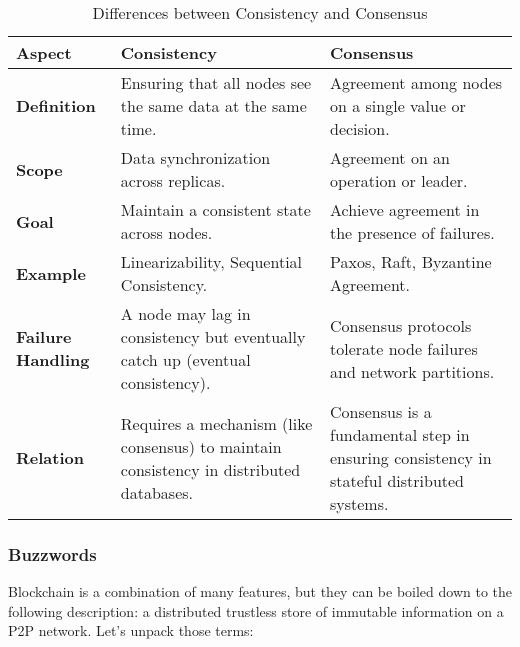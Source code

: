 \begin{table}[h]
    \centering
    \renewcommand{\arraystretch}{1.3}
    \begin{tabular}{|l|p{6cm}|p{6cm}|}
        \hline
        \textbf{Aspect} & \textbf{Consistency} & \textbf{Consensus} \\
        \hline
        \textbf{Definition} & Ensuring that all nodes see the same data at the same time. & Agreement among nodes on a single value or decision. \\
        \hline
        \textbf{Scope} & Data synchronization across replicas. & Agreement on an operation or leader. \\
        \hline
        \textbf{Goal} & Maintain a consistent state across nodes. & Achieve agreement in the presence of failures. \\
        \hline
        \textbf{Example} & Linearizability, Sequential Consistency. & Paxos, Raft, Byzantine Agreement. \\
        \hline
        \textbf{Failure Handling} & A node may lag in consistency but eventually catch up (eventual consistency). & Consensus protocols tolerate node failures and network partitions. \\
        \hline
        \textbf{Relation} & Requires a mechanism (like consensus) to maintain consistency in distributed databases. & Consensus is a fundamental step in ensuring consistency in stateful distributed systems. \\
        \hline
    \end{tabular}
    \caption{Differences between Consistency and Consensus}
    \label{Diff-bw-Consistency-&-Consensus}
\end{table}

\subsubsection{Buzzwords}
Blockchain is a combination of many features, but they can be boiled down to the following description: a distributed trustless store of immutable information on a P2P network. Let's unpack those terms:

